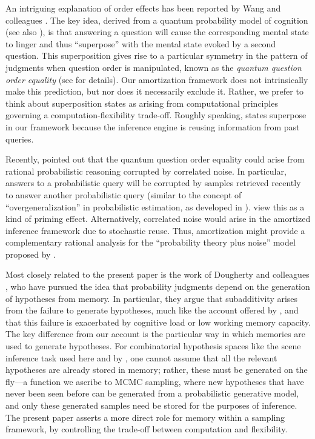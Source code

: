 An intriguing explanation of order effects has been reported by Wang and colleagues \citep{wang2013quantum,wang2014context}. The key idea, derived from a quantum probability model of cognition (see also \citet{trueblood2011quantum}), is that answering a question will cause the corresponding mental state to linger and thus ``superpose'' with the mental state evoked by a second question. This superposition gives rise to a particular symmetry in the pattern of judgments when question order is manipulated, known as the \emph{quantum question order equality} (see \citet{wang2013quantum} for details). Our amortization framework does not intrinsically make this prediction, but nor does it necessarily exclude it. Rather, we prefer to think about superposition states as arising from computational principles governing a computation-flexibility trade-off. Roughly speaking, states superpose in our framework because the inference engine is reusing information from past queries.

Recently, \citet{costello18} pointed out that the quantum question order equality could arise from rational probabilistic reasoning corrupted by correlated noise. In particular, answers to a probabilistic query will be corrupted by samples retrieved recently to answer another probabilistic query (similar to the concept of ``overgeneralization'' in probabilistic estimation, as developed in \citet{marchiori15}). \citet{costello18} view this as a kind of priming effect. Alternatively, correlated noise would arise in the amortized inference framework due to stochastic reuse. Thus, amortization might provide a complementary rational analysis for the ``probability theory plus noise'' model proposed by \citet{costello18}.

Most closely related to the present paper is the work of Dougherty and colleagues \citep{Dougherty1999,Thomas2008,thomas2014memory,dougherty2003hypothesis,dougherty2003probability}, who have pursued the idea that probability judgments depend on the generation of hypotheses from memory. In particular, they argue that subadditivity arises from the failure to generate hypotheses, much like the account offered by \citet{dasgupta2017hypotheses}, and that this failure is exacerbated by cognitive load or low working memory capacity. The key difference from our account is the particular way in which memories are used to generate hypotheses. For combinatorial hypothesis spaces like the scene inference task used here and by \citet{dasgupta2017hypotheses}, one cannot assume that all the relevant hypotheses are already stored in memory; rather, these must be generated on the fly---a function we ascribe to MCMC sampling, where new hypotheses that have never been seen before can be generated from a probabilistic generative model, and only these generated samples need be stored for the purposes of inference. The present paper asserts a more direct role for memory within a sampling framework, by controlling the trade-off between computation and flexibility.

